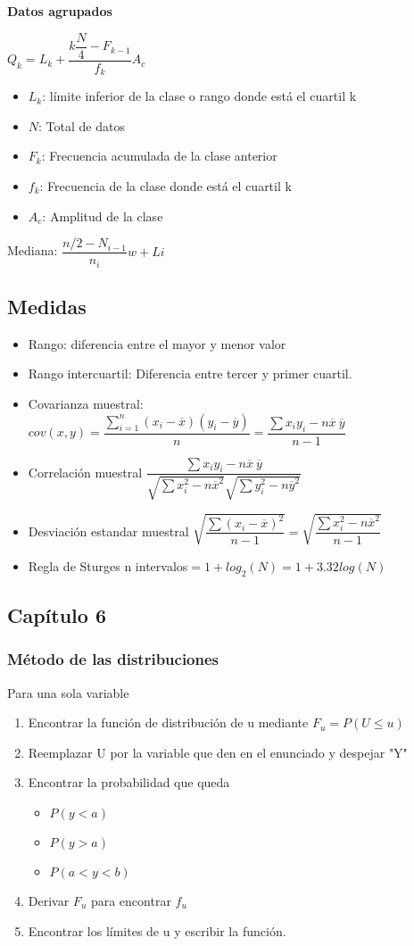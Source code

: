 \textbf{Datos agrupados}

$Q_k=L_k+\dfrac{k\dfrac{N}{4}-F_{k-1}}{f_k}A_c$

\begin{itemize}
	\item $L_k$: límite inferior de la clase o rango donde está el cuartil k
	\item $N$: Total de datos
	\item $F_k$: Frecuencia acumulada de la clase anterior
	\item $f_k$: Frecuencia de la clase donde está el cuartil k
	\item $A_c$: Amplitud de la clase
\end{itemize}
Mediana: $\dfrac{n/2-N_{i-1}}{n_i}w+Li$
\subsection{Medidas}

\begin{itemize}
	\item Rango: diferencia entre el mayor y menor valor
	\item Rango intercuartil: Diferencia entre tercer y primer cuartil.
	\item Covarianza muestral: $cov(x,y)=\dfrac{\sum_{i=1}^n(x_i-\overline{x})(y_i-\overline{y})}{n}=\dfrac{\sum x_iy_i-n\overline{x}\ \overline{y}}{n-1}$
	\item Correlación muestral $\dfrac{\sum x_iy_i-n\overline{x}\ \overline{y}}{\sqrt{\sum x^2_i-n\overline{x}^2}\sqrt{\sum y^2_i-n\overline{y}^2}}$
	\item Desviación estandar muestral $\sqrt{\dfrac{\sum(x_i-\overline{x})^2}{n-1}}=\sqrt{\dfrac{\sum x^2_i-n\overline{x}^2}{n-1}}$
	\item Regla de Sturges n intervalos$=1+log_2(N)=1+3.32log(N)$
\end{itemize}

\subsection{Capítulo 6}
\subsubsection{Método de las distribuciones}
Para una sola variable
\begin{enumerate}
	\item Encontrar la función de distribución de u mediante $F_u=P(U\leq u)$
	\item Reemplazar U por la variable que den en el enunciado y despejar "Y"
	\item Encontrar la probabilidad que queda
	\begin{itemize}
		\item $P(y<a)$
		\item $P(y>a)$
		\item $P(a<y<b)$
	\end{itemize}
	\item Derivar $F_u$ para encontrar $f_u$
	\item Encontrar los límites de u y escribir la función.
\end{enumerate}

